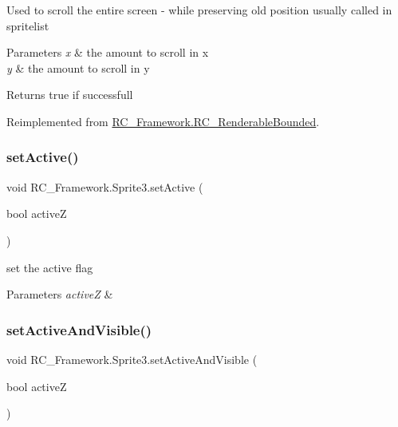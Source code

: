 Used to scroll the entire screen -\/ while preserving old position usually called in spritelist 


\begin{DoxyParams}{Parameters}
{\em x} & the amount to scroll in x \\
\hline
{\em y} & the amount to scroll in y\\
\hline
\end{DoxyParams}
\begin{DoxyReturn}{Returns}
true if successfull 
\end{DoxyReturn}


Reimplemented from \mbox{\hyperlink{class_r_c___framework_1_1_r_c___renderable_bounded_a000dd516577e50fb39fc3e1acc774435}{R\+C\+\_\+\+Framework.\+R\+C\+\_\+\+Renderable\+Bounded}}.

\mbox{\label{class_r_c___framework_1_1_sprite3_a6e007701b261f3c293389e5094513faf}} 
\subsubsection{\texorpdfstring{set\+Active()}{setActive()}}
{\footnotesize\ttfamily void R\+C\+\_\+\+Framework.\+Sprite3.\+set\+Active (\begin{DoxyParamCaption}\item[{bool}]{activeZ }\end{DoxyParamCaption})}



set the active flag 


\begin{DoxyParams}{Parameters}
{\em activeZ} & \\
\hline
\end{DoxyParams}
\mbox{\label{class_r_c___framework_1_1_sprite3_a9299af8d2e5277dd0e810389a7ed831c}} 
\subsubsection{\texorpdfstring{set\+Active\+And\+Visible()}{setActiveAndVisible()}}
{\footnotesize\ttfamily void R\+C\+\_\+\+Framework.\+Sprite3.\+set\+Active\+And\+Visible (\begin{DoxyParamCaption}\item[{bool}]{activeZ }\end{DoxyParamCaption})}



